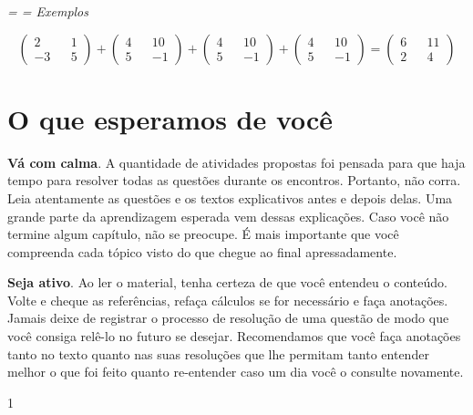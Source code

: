 \documentclass[10pt,openany]{book}
\theoremstyle{estiloQuestao}
\theoremstyle{plain}
\newlength{\identacao}
\newenvironment{caixaExemplo}{\begin{tcolorbox}[%
	grow to left by=1\gridM,
	left=2pt,
	grow to right by=1\gridM,
	right=2pt,
	boxrule=0pt,
	arc=0pt,
	colframe=boxbg,
	colback=boxbg,
	breakable
]
\itshape
\leftskip=\identacao
\rightskip=\identacao}{\end{tcolorbox}}
\begin{document}
\begin{caixaExemplo}
Exemplos

$$\begin{pmatrix} 2 && 1 \\ -3 && 5 \end{pmatrix} + \begin{pmatrix} 4 && 10 \\ 5 && -1 \end{pmatrix} + \begin{pmatrix} 4 && 10 \\ 5 && -1 \end{pmatrix} + \begin{pmatrix} 4 && 10 \\ 5 && -1 \end{pmatrix} = \begin{pmatrix} 6 && 11 \\ 2 && 4  \end{pmatrix}$$


\end{caixaExemplo}



\section{O que esperamos de você}

\textbf{Vá com calma}. A quantidade de atividades propostas foi pensada para que haja tempo para resolver todas as questões durante os encontros. Portanto, não corra. Leia atentamente as questões e os textos explicativos antes e depois delas. Uma grande parte da aprendizagem esperada vem dessas explicações. Caso você não termine algum capítulo, não se preocupe. É mais importante que você compreenda cada tópico visto do que chegue ao final apressadamente.
 
\textbf{Seja ativo}. Ao ler o material, tenha certeza de que você entendeu o conteúdo. Volte e cheque as referências, refaça cálculos se for necessário e faça anotações. Jamais deixe de registrar o processo de resolução de uma questão de modo que você consiga relê-lo no futuro se desejar. Recomendamos que você faça anotações tanto no texto quanto nas suas resoluções que lhe permitam tanto entender  melhor o que foi feito quanto re-entender caso um dia você o consulte novamente. 

1                                                            \tab 
 
\end{document}
